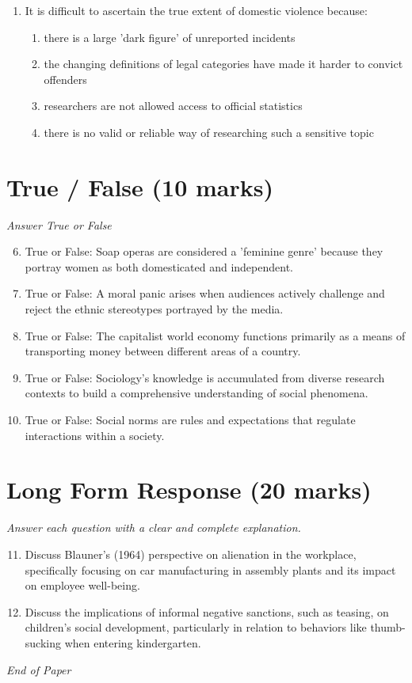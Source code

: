 \documentclass[12pt]{article}
\begin{document}
\begin{enumerate}[label=\arabic*.]
\begin{enumerate}[label=(\alph*)]
    \item women's criminal behaviour tended to reflect traditional gender roles
    \item all of the above
\end{enumerate}
\item It is difficult to ascertain the true extent of domestic violence because:
\begin{enumerate}[label=(\alph*)]
    \item there is a large 'dark figure' of unreported incidents
    \item the changing definitions of legal categories have made it harder to convict offenders
    \item researchers are not allowed access to official statistics
    \item there is no valid or reliable way of researching such a sensitive topic
\end{enumerate}
\end{enumerate}

\section*{True / False (10 marks)}
\textit{Answer True or False}
\begin{enumerate}[label=\arabic*.]
\setcounter{enumi}{5}
\item True or False: Soap operas are considered a 'feminine genre' because they portray women as both domesticated and independent.
\item True or False: A moral panic arises when audiences actively challenge and reject the ethnic stereotypes portrayed by the media.
\item True or False: The capitalist world economy functions primarily as a means of transporting money between different areas of a country.
\item True or False: Sociology's knowledge is accumulated from diverse research contexts to build a comprehensive understanding of social phenomena.
\item True or False: Social norms are rules and expectations that regulate interactions within a society.
\end{enumerate}

\section*{Long Form Response (20 marks)}
\textit{Answer each question with a clear and complete explanation.}
\begin{enumerate}[label=\arabic*.]
\setcounter{enumi}{10}
\item Discuss Blauner's (1964) perspective on alienation in the workplace, specifically focusing on car manufacturing in assembly plants and its impact on employee well-being.
\item Discuss the implications of informal negative sanctions, such as teasing, on children's social development, particularly in relation to behaviors like thumb-sucking when entering kindergarten.
\end{enumerate}

\vfill
\noindent\textit{End of Paper}
\end{document}
